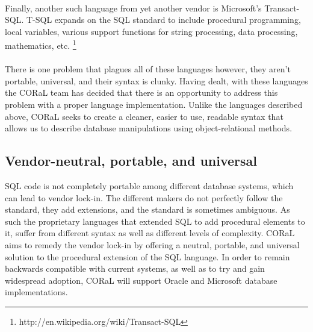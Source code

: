 \documentclass[11pt]{report}
\begin{document}
\\
Finally, another such language from yet another vendor is Microsoft’s Transact-SQL. T-SQL expands on the SQL standard to include procedural programming, local variables, various support functions for string processing, data processing, mathematics, etc. \footnote{http://en.wikipedia.org/wiki/Transact-SQL}\\
\\
There is one problem that plagues all of these languages however, they aren’t portable, universal, and their syntax is clunky. Having dealt, with these languages the CORaL team has decided that there is an opportunity to address this problem with a proper language implementation. Unlike the languages described above, CORaL seeks to create a cleaner, easier to use, readable syntax that allows us to describe database manipulations using object-relational methods.

\subsection*{Vendor-neutral, portable, and universal}

SQL code is not completely portable among different database systems, which can lead to vendor lock-in. The different makers do not perfectly follow the standard, they add extensions, and the standard is sometimes ambiguous. As such the proprietary languages that extended SQL to add procedural elements to it, suffer from different syntax as well as different levels of complexity. CORaL aims to remedy the vendor lock-in by offering a neutral, portable, and universal solution to the procedural extension of the SQL language. In order to remain backwards compatible with current systems, as well as to try and gain widespread adoption, CORaL will support Oracle and Microsoft database implementations.
\end{document}
